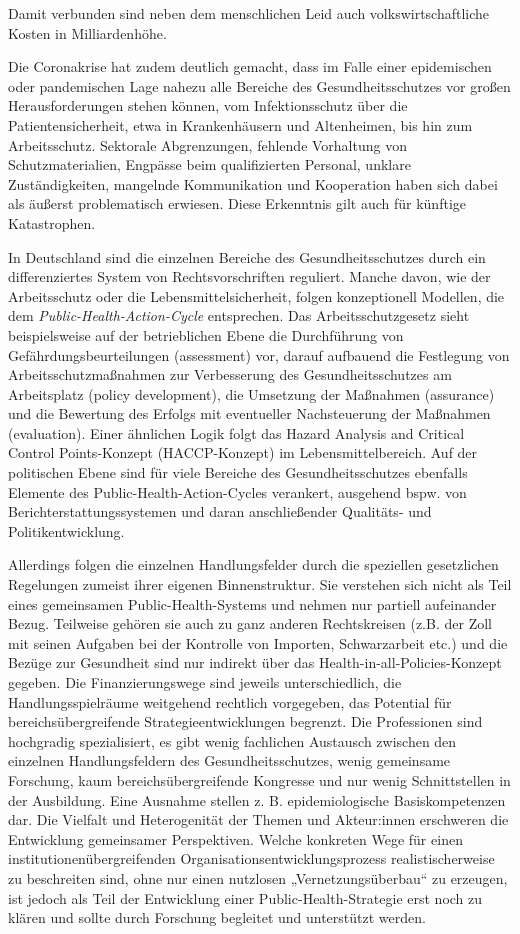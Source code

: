 \documentclass{article}
\begin{document}
Damit verbunden sind neben dem menschlichen Leid auch volkswirtschaftliche Kosten in Milliardenhöhe. 


Die Coronakrise hat zudem deutlich gemacht, dass im Falle einer epidemischen oder pandemischen Lage nahezu alle Bereiche des Gesundheitsschutzes vor großen Herausforderungen stehen können, vom Infektionsschutz über die Patientensicherheit, etwa in Krankenhäusern und Altenheimen, bis hin zum Arbeitsschutz. Sektorale Abgrenzungen, fehlende Vorhaltung von Schutzmaterialien, Engpässe beim qualifizierten Personal, unklare Zuständigkeiten, mangelnde Kommunikation und Kooperation haben sich dabei als äußerst problematisch erwiesen. Diese Erkenntnis gilt auch für künftige Katastrophen.


In Deutschland sind die einzelnen Bereiche des Gesundheitsschutzes durch ein differenziertes System von Rechtsvorschriften reguliert. Manche davon, wie der Arbeitsschutz oder die Lebensmittelsicherheit, folgen konzeptionell Modellen, die dem \emph{Public-Health-Action-Cycle} entsprechen. Das Arbeitsschutzgesetz sieht beispielsweise auf der betrieblichen Ebene die Durchführung von Gefährdungsbeurteilungen (assessment) vor, darauf aufbauend die Festlegung von Arbeitsschutzmaßnahmen zur Verbesserung des Gesundheitsschutzes am Arbeitsplatz (policy development), die Umsetzung der Maßnahmen (assurance) und die Bewertung des Erfolgs mit eventueller Nachsteuerung der Maßnahmen (evaluation). Einer ähnlichen Logik folgt das Hazard Analysis and Critical Control Points-Konzept (HACCP-Konzept) im Lebensmittelbereich. Auf der politischen Ebene sind für viele Bereiche des Gesundheitsschutzes ebenfalls Elemente des Public-Health-Action-Cycles verankert, ausgehend bspw. von Berichterstattungssystemen und daran anschließender Qualitäts- und Politikentwicklung.


Allerdings folgen die einzelnen Handlungsfelder durch die speziellen gesetzlichen Regelungen zumeist ihrer eigenen Binnenstruktur. Sie verstehen sich nicht als Teil eines gemeinsamen Public-Health-Systems und nehmen nur partiell aufeinander Bezug. Teilweise gehören sie auch zu ganz anderen Rechtskreisen (z.B. der Zoll mit seinen Aufgaben bei der Kontrolle von Importen, Schwarzarbeit etc.) und die Bezüge zur Gesundheit sind nur indirekt über das Health-in-all-Policies-Konzept gegeben. Die Finanzierungswege sind jeweils unterschiedlich, die Handlungsspielräume weitgehend rechtlich vorgegeben, das Potential für bereichsübergreifende Strategieentwicklungen begrenzt. Die Professionen sind hochgradig spezialisiert, es gibt wenig fachlichen Austausch zwischen den einzelnen Handlungsfeldern des Gesundheitsschutzes, wenig gemeinsame Forschung, kaum bereichsübergreifende Kongresse und nur wenig Schnittstellen in der Ausbildung. Eine Ausnahme stellen z. B. epidemiologische Basiskompetenzen dar. Die Vielfalt und Heterogenität der Themen und Akteur:innen erschweren die Entwicklung gemeinsamer Perspektiven. Welche konkreten Wege für einen institutionenübergreifenden Organisationsentwicklungsprozess realistischerweise zu beschreiten sind, ohne nur einen nutzlosen „Vernetzungsüberbau“ zu erzeugen, ist jedoch als Teil der Entwicklung einer Public-Health-Strategie erst noch zu klären und sollte durch Forschung begleitet und unterstützt werden.
\end{document}
